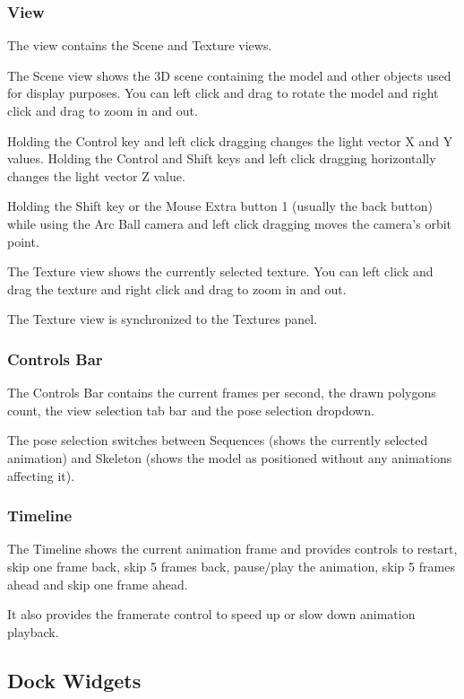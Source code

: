\documentclass[10pt, a4paper, titlepage, oneside]{article}
\begin{document}
\subsubsection{View}

The view contains the Scene and Texture views.

The Scene view shows the 3D scene containing the model and other objects used for display purposes. You can left click and drag to rotate the model and right click and drag to zoom in and out.

Holding the Control key and left click dragging changes the light vector X and Y values. Holding the Control and Shift keys and left click dragging horizontally changes the light vector Z value.

Holding the Shift key or the Mouse Extra button 1 (usually the back button) while using the Arc Ball camera and left click dragging moves the camera's orbit point.

The Texture view shows the currently selected texture. You can left click and drag the texture and right click and drag to zoom in and out.

The Texture view is synchronized to the Textures panel.

\subsubsection{Controls Bar}

The Controls Bar contains the current frames per second, the drawn polygons count, the view selection tab bar and the pose selection dropdown.

The pose selection switches between Sequences (shows the currently selected animation) and Skeleton (shows the model as positioned without any animations affecting it).

\subsubsection{Timeline}

The Timeline shows the current animation frame and provides controls to restart, skip one frame back, skip 5 frames back, pause/play the animation, skip 5 frames ahead and skip one frame ahead.

It also provides the framerate control to speed up or slow down animation playback.

\newpage

\subsection{Dock Widgets}
\end{document}
